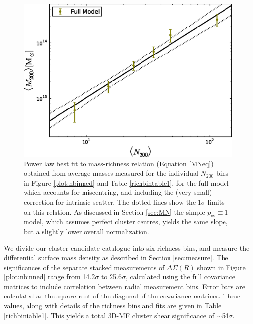 \begin{figure}
\begin{center}
  \includegraphics[scale=0.7]{plots_ch4/MassRich_shear_FullModelOnly_DuttonMaccio_IntrinsicScatter.eps}
  \caption[Mass-Richness Relation from Shear]{Power law best fit to mass-richness relation (Equation \ref{MNeq}) obtained from average masses measured for the individual $N_{200}$ bins in Figure \ref{plot:nbinned} and Table \ref{richbintable1}, for the full model which accounts for miscentring, and including the (very small) correction for intrinsic scatter. The dotted lines show the 1$\sigma$ limits on this relation. As discussed in Section \ref{sec:MN} the simple $p_{\mathrm{cc}} \equiv 1$ model, which assumes perfect cluster centres, yields the same slope, but a slightly lower overall normalization.}
\label{plot:massrich}
\end{center}
\end{figure}


We divide our cluster candidate catalogue into six richness bins, and measure the differential surface mass density as described in Section \ref{sec:measure}. The significances of the separate stacked measurements of $\Delta\Sigma(R)$ shown in Figure \ref{plot:nbinned} range from 14.2$\sigma$ to 25.6$\sigma$, calculated using the full covariance matrices to include correlation between radial measurement bins. Error bars are calculated as the square root of the diagonal of the covariance matrices. These values, along with details of the richness bins and fits are given in Table \ref{richbintable1}. This yields a total \ac{3D-MF} cluster shear significance of $\sim$54$\sigma$. 

